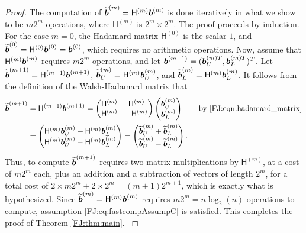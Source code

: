 \documentclass[graybox,footinfo]{svmult}
\begin{document}
\begin{proof}
{The computation of $\widetilde{{\boldsymbol{b}}}^{(m)} =\mathsf{H}^{(m)} {\boldsymbol{b}}^{(m)}$ is done iteratively in what we  show to be $m2^m$ operations, where $\mathsf{H}^{(m)}$ is $2^m \times 2^m$.  The proof proceeds by induction.  For the case $m=0$, the Hadamard matrix $\mathsf{H}^{(0)}$ is the scalar $1$, and $\widetilde{{\boldsymbol{b}}}^{(0)} = \mathsf{H}^{(0)} {\boldsymbol{b}}^{(0)} = {\boldsymbol{b}}^{(0)}$, which requires no arithmetic operations.  Now, assume that $\mathsf{H}^{(m)} {\boldsymbol{b}}^{(m)}$ requires $m2^m$ operations, and let ${\boldsymbol{b}}^{(m+1)} = ({\boldsymbol{b}}^{(m)T}_U,  {\boldsymbol{b}}^{(m)T}_L)^T$.  Let $\widetilde{{\boldsymbol{b}}}^{(m+1)} = \mathsf{H}^{(m+1)} {\boldsymbol{b}}^{(m+1)}$,  $\widetilde{{\boldsymbol{b}}}^{(m)}_U = \mathsf{H}^{(m)} {\boldsymbol{b}}^{(m)}_U$, and $\widetilde{{\boldsymbol{b}}}^{(m)}_L = \mathsf{H}^{(m)} {\boldsymbol{b}}^{(m)}_L$.  It follows from the definition of the Walsh-Hadamard matrix that 
\begin{align*}
\widetilde{{\boldsymbol{b}}}^{(m+1)} &= \mathsf{H}^{({m+1})} {\boldsymbol{b}}^{(m+1)} = \begin{pmatrix}
\mathsf{H}^{(m)} & \mathsf{H}^{(m)} \\ \mathsf{H}^{(m)} & - \mathsf{H}^{(m)}
\end{pmatrix} 
\begin{pmatrix}
{\boldsymbol{b}}^{(m)}_U\\ {\boldsymbol{b}}^{(m)}_L
\end{pmatrix} \qquad \text{by \eqref{FJ:eqn:hadamard_matrix}} \\
&= 
\begin{pmatrix}
\mathsf{H}^{(m)} {\boldsymbol{b}}^{(m)}_U + \mathsf{H}^{(m)}{\boldsymbol{b}}^{(m)}_L \\ 
\mathsf{H}^{(m)} {\boldsymbol{b}}^{(m)}_U - \mathsf{H}^{(m)} {\boldsymbol{b}}^{(m)}_L
\end{pmatrix}
= 
\begin{pmatrix}
\widetilde{{\boldsymbol{b}}}^{(m)}_U + \widetilde{{\boldsymbol{b}}}^{(m)}_L \\ 
\widetilde{{\boldsymbol{b}}}^{(m)}_U - \widetilde{{\boldsymbol{b}}}^{(m)}_L
\end{pmatrix}.
\end{align*}
Thus, to compute $\widetilde{{\boldsymbol{b}}}^{({m+1})}$ requires two matrix multiplications by $\mathsf{H}^{(m)}$, at a cost of $m 2^m$ each, plus an addition and a subtraction of vectors of length $2^m$, for a total cost of $2 \times m 2^m + 2 \times 2^m = (m+1) 2^{m+1}$, which is exactly what is hypothesized.  Since $\widetilde{{\boldsymbol{b}}}^{(m)} =\mathsf{H}^{(m)} {\boldsymbol{b}}^{(m)}$ requires $m2^m = n \log_2(n)$ operations to compute, assumption \eqref{FJ:eq:fastcompAssumpC} is satisfied.  This completes the proof of Theorem \ref{FJ:thm:main}.
}
\end{proof}
\end{document}
